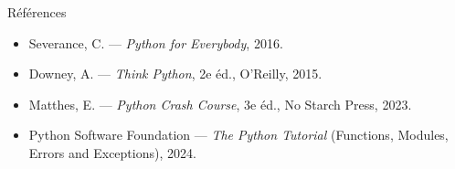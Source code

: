 \documentclass[aspectratio=169,11pt]{beamer}
\begin{document}
\begin{frame}{Références}
\begin{itemize}\small
  \item Severance, C. — \emph{Python for Everybody}, 2016.
  \item Downey, A. — \emph{Think Python}, 2e éd., O'Reilly, 2015.
  \item Matthes, E. — \emph{Python Crash Course}, 3e éd., No Starch Press, 2023.
  \item Python Software Foundation — \emph{The Python Tutorial} (Functions, Modules, Errors and Exceptions), 2024.
\end{itemize}
\end{frame}
\end{document}
